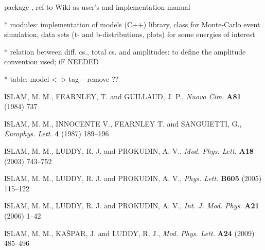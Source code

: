 \documentclass[preprint,12pt]{elsarticle}
\begin{document}
package \cite{elegent}, ref to Wiki as user's and implementation manual

* modules: implementation of models (C++) library, class for Monte-Carlo event simulation, data sets (t- and b-distributions, plots) for some energies of interest

* relation between diff. cs., total cs. and amplitudes: to define the amplitude convention used; iF NEEDED

* table: model <--> tag -- remove ??



\begin{thebibliography}{00}


\def\Name#1{#1, }
\def\REVIEW#1#2#3#4{{\it #1} {\bf #2} (#3) #4}

	\Name{ISLAM, M. M., FEARNLEY, T. and GUILLAUD, J. P.}
	\REVIEW{Nuovo Cim.}{A81}{1984}{737}

	\Name{ISLAM, M. M., INNOCENTE V., FEARNLEY T. and SANGUIETTI, G.}
	\REVIEW{Europhys. Lett.}{4}{1987}{189--196}

	\Name{ISLAM, M. M., LUDDY, R. J. and PROKUDIN, A. V.}
	\REVIEW{Mod. Phys. Lett.}{A18}{2003}{743--752}

	\Name{ISLAM, M. M., LUDDY, R. J. and PROKUDIN, A. V.}
	\REVIEW{Phys. Lett.}{B605}{2005}{115--122}
    
	\Name{ISLAM, M. M., LUDDY, R. J. and PROKUDIN, A. V.}
	\REVIEW{Int. J. Mod. Phys.}{A21}{2006}{1--42}


	\Name{ISLAM, M. M., KA\v SPAR, J. and LUDDY, R. J.}
	\REVIEW{Mod. Phys. Lett.}{A24}{2009}{485--496}



\end{thebibliography}
\end{document}
